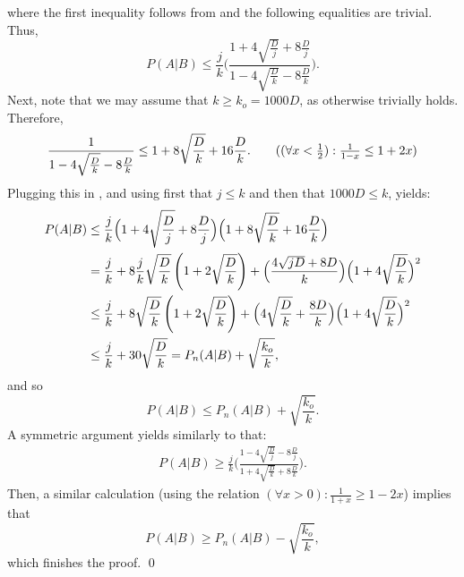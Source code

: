 \documentclass{article}
\begin{document}
where the first inequality follows from  and the following equalities are trivial.
Thus,
\begin{equation}\label{eq:16}
P(A \vert B) \leq\frac{j}{k}\Biggl(\frac{1+ 4\sqrt{\frac{D}{j}} + 8\frac{D}{j}}{1 - 4\sqrt{\frac{D}{k}} - 8\frac{D}{k}}\Biggr).
\end{equation}
Next, note that we may assume that $k\geq k_o=1000D$, as otherwise  trivially holds. Therefore,
\begin{align*}
\frac{1}{1 - 4\sqrt{\frac{D}{k}} - 8\frac{D}{k}} \leq 
1 + 8\sqrt{\frac{D}{k}} + 16\frac{D}{k}. \tag{$(\forall x<\frac{1}{2}):\frac{1}{1-x} \leq 1+2x$}
\end{align*}
Plugging this in , and using first that $j\leq k$ and then that $1000D\leq k$, yields:
\begin{align*}
P(A \vert B) &\leq \frac{j}{k}\Bigl(1+ 4\sqrt{\frac{D}{j}} + 8\frac{D}{j}\Bigr)\Bigl(1 + 8\sqrt{\frac{D}{k}} + 16\frac{D}{k}\Bigr) \\
&= \frac{j}{k} + 8 \frac{j}{k} \sqrt{\frac{D}{k}} \left( 1 + 2 \sqrt{\frac{D}{k}} \right) + \Bigl( \frac{4\sqrt{j D} + 8D}{k}\Bigr) \Bigl(1 + 4\sqrt{\frac{D}{k}} \Bigr)^2 \\
&\leq \frac{j}{k} + 8 \sqrt{\frac{D}{k}} \left( 1 + 2 \sqrt{\frac{D}{k}} \right) + \Bigl( 4 \sqrt{\frac{D}{k}} + \frac{8D}{k}\Bigr) \Bigl(1 + 4\sqrt{\frac{D}{k}} \Bigr)^2 \\
&\leq \frac{j}{k} + 30\sqrt{\frac{D}{k}} = P_n(A\vert B)  + \sqrt{\frac{k_o}{k}},
\end{align*}
and so 
\[
P(A \vert B) \leq  P_n(A\vert B)  + \sqrt{\frac{k_o}{k}}.
\]
A symmetric argument yields similarly to  that:
\begin{align*}
P(A \vert B) \geq\frac{j}{k}\Biggl(\frac{1 - 4\sqrt{\frac{D}{j}} - 8\frac{D}{j}}{1 + 4\sqrt{\frac{D}{k}} + 8\frac{D}{k}}\Biggr).
\end{align*}
Then, a similar calculation (using the relation $(\forall x > 0):\frac{1}{1+x} \geq 1-2x$) implies that
\[
P(A \vert B) \geq  P_n(A\vert B)  - \sqrt{\frac{k_o}{k}},
\]
which finishes the proof.
\qed
\end{document}
